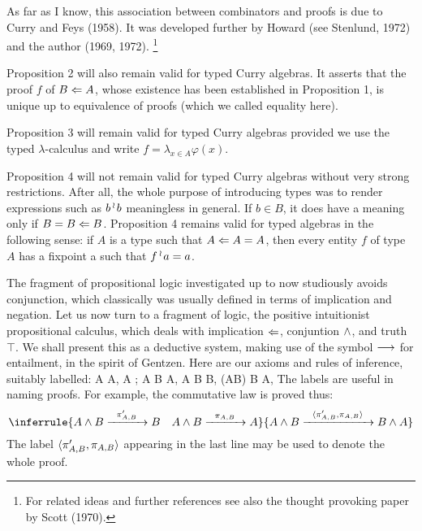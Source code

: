 As far as I know, this association between combinators and proofs is due to Curry and Feys (1958).
It was developed further by Howard (see Stenlund, 1972) and the author (1969, 1972).%
\footnote{For related ideas and further references see also the thought provoking paper by Scott (1970).}%

Proposition 2 will also remain valid for typed Curry algebras.
It asserts that the proof $f$ of $B \Leftarrow A$, whose existence has
been established in Proposition 1, is unique up to equivalence of
proofs (which we called equality here).

Proposition 3 will remain valid for typed Curry algebras
provided we use the typed $\lambda$-calculus and write
$f = \lambda_{x \in A} \varphi(x)$.

Proposition 4 will not remain valid for typed Curry algebras without
very strong restrictions. After all, the whole purpose of introducing types was
to render expressions such as $b \mathop{{}^\wr}\kern-.8pt b$ meaningless in general. If $b \in B$, it does have
a meaning only if $B = B \Leftarrow B$. Proposition 4 remains valid for typed algebras in the
following sense: if $A$ is a type such that $A \Leftarrow A = A$, then every entity $f$ of type $A$
has a fixpoint a such that $f\mathop{{}^\wr}\kern-.8pt a= a$.

The fragment of propositional logic investigated up to now studiously avoids
conjunction, which classically was usually defined in terms of implication and negation.
Let us now turn to a fragment of logic, the positive intuitionist propositional calculus,
which deals with implication $\Leftarrow$, conjuntion $\wedge$, and truth $\top$.
We shall present this as a deductive system, making use of the symbol $\longrightarrow$ for entailment,
in the spirit of Gentzen. Here are our axioms and rules of inference, suitably labelled:
\bes
A  A, \qquad {}
\ees
\bes
A  \top;
\ees
\bes
A \sland B  A,\,\,A \sland B  B, \quad
{}
\ees
\bes
(A\from B) \sland B  A, \qquad {}
\ees
The labels are useful in naming proofs. For example, the commutative law is proved thus:
$$
\inferrule{A \sland B \xto{\pi'_{A,B}} B\quad A \sland B \xto{\pi_{A,B}} A}{A \sland B \xto{\la \pi'_{A,B},\pi_{A,B}\ra} B\sland A}
$$
The label $\langle \pi'_{A,B},\pi_{A,B}\rangle$ appearing in the last line may be used
to denote the whole proof.

